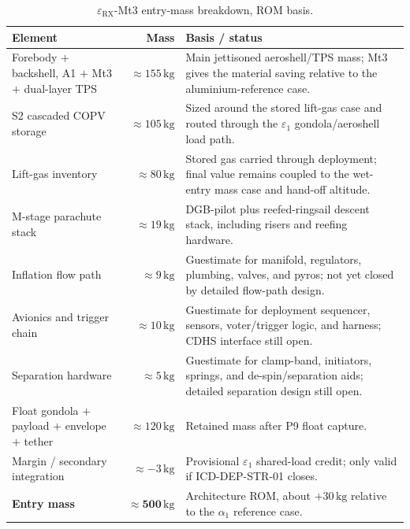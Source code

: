 \begin{table}[H]
\centering
\renewcommand{\arraystretch}{1}
\caption{$\varepsilon_{\mathrm{RX}}$-Mt3 entry-mass breakdown, ROM basis.}
\label{tab:eRX-Mt3-mass}
\footnotesize
\begin{tabularx}{\textwidth}{@{}X r X@{}}
\toprule
\textbf{Element} & \textbf{Mass} & \textbf{Basis / status} \\
\midrule
Forebody $+$ backshell, A1 $+$ Mt3 $+$ dual-layer TPS & $\approx155\,\mathrm{kg}$ & Main jettisoned aeroshell/TPS mass; Mt3 gives the material saving relative to the aluminium-reference case. \\
S2 cascaded COPV storage & $\approx105\,\mathrm{kg}$ & Sized around the stored lift-gas case and routed through the $\varepsilon_1$ gondola/aeroshell load path. \\
Lift-gas inventory & $\approx80\,\mathrm{kg}$ & Stored gas carried through deployment; final value remains coupled to the wet-entry mass case and hand-off altitude. \\
M-stage parachute stack & $\approx19\,\mathrm{kg}$ & DGB-pilot plus reefed-ringsail descent stack, including risers and reefing hardware. \\
Inflation flow path & $\approx9\,\mathrm{kg}$ & Guestimate for manifold, regulators, plumbing, valves, and pyros; not yet closed by detailed flow-path design. \\
Avionics and trigger chain & $\approx10\,\mathrm{kg}$ & Guestimate for deployment sequencer, sensors, voter/trigger logic, and harness; CDHS interface still open. \\
Separation hardware & $\approx5\,\mathrm{kg}$ & Guestimate for clamp-band, initiators, springs, and de-spin/separation aids; detailed separation design still open. \\
Float gondola $+$ payload $+$ envelope $+$ tether & $\approx120\,\mathrm{kg}$ & Retained mass after P9 float capture. \\
Margin / secondary integration & $\approx-3\,\mathrm{kg}$ & Provisional $\varepsilon_1$ shared-load credit; only valid if ICD-DEP-STR-01 closes. \\
\midrule
\textbf{Entry mass} & $\mathbf{\approx500\,\mathrm{kg}}$ & Architecture ROM, about $+30\,\mathrm{kg}$ relative to the $\alpha_1$ reference case. \\
\bottomrule
\end{tabularx}
\end{table}

